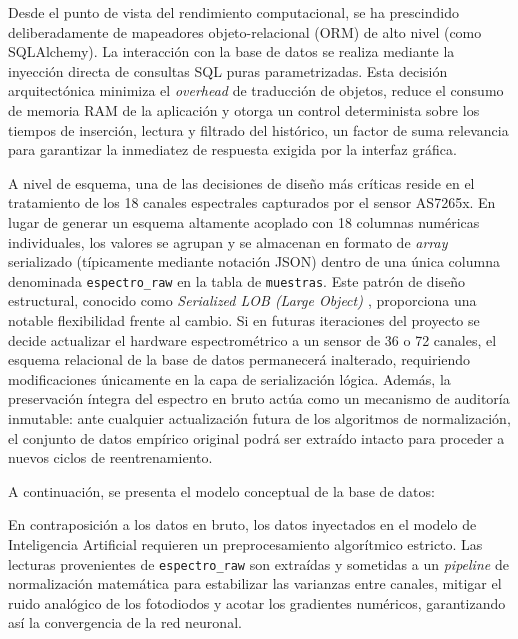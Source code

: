 Desde el punto de vista del rendimiento computacional, se ha prescindido deliberadamente de mapeadores objeto-relacional (ORM) de alto nivel (como SQLAlchemy). La interacción con la base de datos se realiza mediante la inyección directa de consultas SQL puras parametrizadas. Esta decisión arquitectónica minimiza el \textit{overhead} de traducción de objetos, reduce el consumo de memoria RAM de la aplicación y otorga un control determinista sobre los tiempos de inserción, lectura y filtrado del histórico, un factor de suma relevancia para garantizar la inmediatez de respuesta exigida por la interfaz gráfica.

A nivel de esquema, una de las decisiones de diseño más críticas reside en el tratamiento de los 18 canales espectrales capturados por el sensor AS7265x. En lugar de generar un esquema altamente acoplado con 18 columnas numéricas individuales, los valores se agrupan y se almacenan en formato de \textit{array} serializado (típicamente mediante notación JSON) dentro de una única columna denominada \texttt{espectro\_raw} en la tabla de \texttt{muestras}. Este patrón de diseño estructural, conocido como \textit{Serialized LOB (Large Object) \cite{fowler2002eap}}, proporciona una notable flexibilidad frente al cambio. Si en futuras iteraciones del proyecto se decide actualizar el hardware espectrométrico a un sensor de 36 o 72 canales, el esquema relacional de la base de datos permanecerá inalterado, requiriendo modificaciones únicamente en la capa de serialización lógica. Además, la preservación íntegra del espectro en bruto actúa como un mecanismo de auditoría inmutable: ante cualquier actualización futura de los algoritmos de normalización, el conjunto de datos empírico original podrá ser extraído intacto para proceder a nuevos ciclos de reentrenamiento.

A continuación, se presenta el modelo conceptual de la base de datos:


En contraposición a los datos en bruto, los datos inyectados en el modelo de Inteligencia Artificial requieren un preprocesamiento algorítmico estricto. Las lecturas provenientes de \texttt{espectro\_raw}  son extraídas y sometidas a un \textit{pipeline} de normalización matemática para estabilizar las varianzas entre canales, mitigar el ruido analógico de los fotodiodos y acotar los gradientes numéricos, garantizando así la convergencia de la red neuronal.

